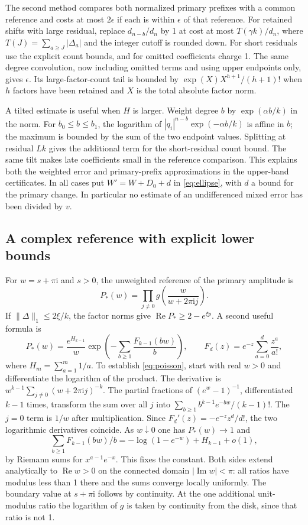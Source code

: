 \documentclass[11pt,reqno]{amsart}
\theoremstyle{remark}
\newcommand{\iu}{\mathrm{i}}
\DeclareMathOperator{\Rea}{Re}
\begin{document}
The second method compares both normalized primary prefixes with a common reference and costs at most $2\epsilon$ if each is within $\epsilon$ of that reference. For retained shifts with large residual, replace $d_{n-b}/d_n$ by 1 at cost at most $T(\gamma k)/d_n$, where $T(J)=\sum_{a\ge J}|\Delta_a|$ and the integer cutoff is rounded down. For short residuals use the explicit count bounds, and for omitted coefficients charge 1. The same degree convolution, now including omitted terms and using upper endpoints only, gives $\epsilon$. Its large-factor-count tail is bounded by $\exp(X)X^{h+1}/(h+1)!$ when $h$ factors have been retained and $X$ is the total absolute factor norm.

A tilted estimate is useful when $H$ is larger. Weight degree $b$ by $\exp(\alpha b/k)$ in the norm. For $b_0\le b\le b_1$, the logarithm of
$|q_i|^{n-b}\exp(-\alpha b/k)$ is affine in $b$; the maximum is bounded by the sum of the two endpoint values. Splitting at residual $Lk$ gives the additional term for the short-residual count bound. The same tilt makes late coefficients small in the reference comparison. This explains both the weighted error and primary-prefix approximations in the upper-band certificates.
In all cases put $W'=W+D_0+d$ in \eqref{eq:ellipse}, with $d$ a bound for the primary change. In particular no estimate of an undifferenced mixed error has been divided by $v$.

\subsection{A complex reference with explicit lower bounds}
For $w=s+\pi\iu$ and $s>0$, the unweighted reference of the primary amplitude is
\[
 P_*(w)=\prod_{j\ne0}g\left(\frac{w}{w+2\pi\iu j}\right).
\]
If $\|\Delta\|_1\le 2\xi/k$, the factor norms give $\Rea P_*\ge 2-e^{\xi p}$. A second useful formula is
\begin{equation}\label{eq:poisson}
 P_*(w)=\frac{e^{H_{k-1}}}{w}
 \exp\left(-\sum_{b\ge1}\frac{F_{k-1}(bw)}b\right),\qquad
 F_d(z)=e^{-z}\sum_{a=0}^d\frac{z^a}{a!},
\end{equation}
where $H_m=\sum_{a=1}^m1/a$. To establish \eqref{eq:poisson}, start with real $w>0$ and differentiate the logarithm of the product. The derivative is
$w^{k-1}\sum_{j\ne0}(w+2\pi\iu j)^{-k}$.
The partial fractions of $(e^w-1)^{-1}$, differentiated $k-1$ times, transform the sum over all $j$ into
$\sum_{b\ge1}b^{k-1}e^{-bw}/(k-1)!$.
The $j=0$ term is $1/w$ after multiplication. Since
$F_d'(z)=-e^{-z}z^d/d!$, the two logarithmic derivatives coincide. As $w\downarrow0$ one has $P_*(w)\to1$ and
\[
 \sum_{b\ge1}F_{k-1}(bw)/b
   =-\log(1-e^{-w})+H_{k-1}+o(1),
\]
by Riemann sums for $x^{a-1}e^{-x}$. This fixes the constant. Both sides extend analytically to $\Rea w>0$ on the connected domain
$|\operatorname{Im} w|<\pi$: all ratios have modulus less than 1 there and the sums converge locally uniformly. The boundary value at $s+\pi\iu$ follows by continuity. At the one additional unit-modulus ratio the logarithm of $g$ is taken by continuity from the disk, since that ratio is not 1.
\end{document}
